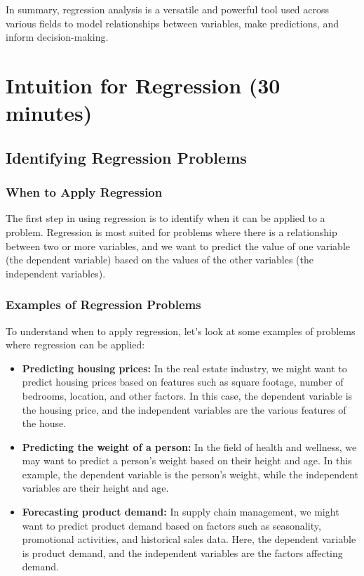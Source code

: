 \documentclass{article}
\begin{document}
In summary, regression analysis is a versatile and powerful tool used across various fields to model relationships between variables, make predictions, and inform decision-making.

\section{Intuition for Regression (30 minutes)}
\subsection{Identifying Regression Problems}

\subsubsection{When to Apply Regression}

The first step in using regression is to identify when it can be applied to a problem. Regression is most suited for problems where there is a relationship between two or more variables, and we want to predict the value of one variable (the dependent variable) based on the values of the other variables (the independent variables).

\subsubsection{Examples of Regression Problems}

To understand when to apply regression, let's look at some examples of problems where regression can be applied:

\begin{itemize}
\item \textbf{Predicting housing prices:} In the real estate industry, we might want to predict housing prices based on features such as square footage, number of bedrooms, location, and other factors. In this case, the dependent variable is the housing price, and the independent variables are the various features of the house.
\item \textbf{Predicting the weight of a person:} In the field of health and wellness, we may want to predict a person's weight based on their height and age. In this example, the dependent variable is the person's weight, while the independent variables are their height and age.
\item \textbf{Forecasting product demand:} In supply chain management, we might want to predict product demand based on factors such as seasonality, promotional activities, and historical sales data. Here, the dependent variable is product demand, and the independent variables are the factors affecting demand.
\end{itemize}
\end{document}
